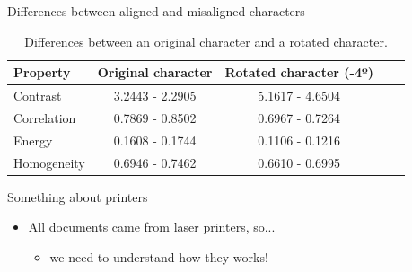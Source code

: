 \documentclass[notes]{beamer}
\begin{document}
\begin{frame}

\begin{block}{Differences between aligned and misaligned characters}

\begin{table}
\label{tab:properties_differences}
\caption{Differences between an original character and a rotated character.}
\begin{center}
\begin{tabular}{l*{3}{c}r}
Property & Original character & Rotated character (-4º) \\
\hline
Contrast & 3.2443 - 2.2905 & 5.1617 - 4.6504 \\
Correlation & 0.7869 - 0.8502 & 0.6967 - 0.7264 \\
Energy & 0.1608 - 0.1744 & 0.1106 - 0.1216 \\
Homogeneity & 0.6946 - 0.7462 & 0.6610 - 0.6995 \\
\end{tabular}
\end{center}
\end{table}

\end{block}

\end{frame}

\begin{frame}

\begin{block}{Something about printers}

\begin{itemize}

\item All documents came from laser printers, so...\pause

\begin{itemize}

\item we need to understand how they works!

\end{itemize}

\end{itemize}

\end{block}

\end{frame}
\end{document}
